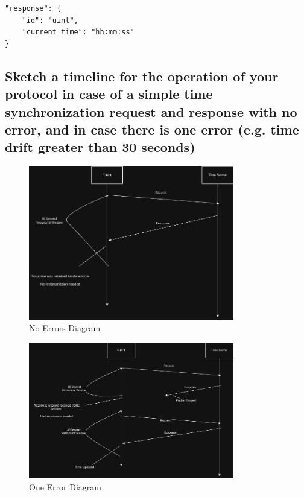 \documentclass{article}
\begin{document}
		\begin{verbatim}
"response": {
	"id": "uint",
	"current_time": "hh:mm:ss"
}
		\end{verbatim}

\subsection{Sketch a timeline for the operation of your protocol in case of a simple time
synchronization request and response with no error, and in case there is one error (e.g.
time drift greater than 30 seconds)}

	\begin{figure}[H]
		\centering
		\includegraphics[width=0.8\textwidth]{no_errors.jpg}
		\caption{No Errors Diagram}
		\label{fig:no_errors}
	\end{figure}

	\begin{figure}[H]
		\centering
		\includegraphics[width=0.8\textwidth]{one_error.jpg}
		\caption{One Error Diagram}
		\label{fig:one_error}
	\end{figure}
\end{document}
